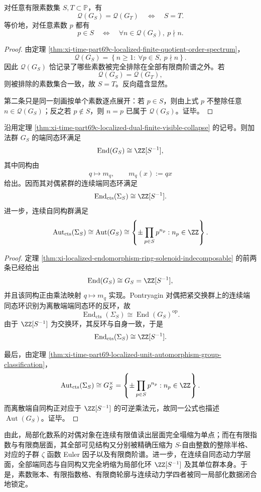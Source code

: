 \begin{corollary}[有限商轮廓对素数账本的完全恢复]\label{cor:xi-time-part69c-localized-finite-quotient-profile-recovers-primes}
对任意有限素数集 \(S,T\subset\mathbb P\)，有
\[
\mathcal Q(G_S)=\mathcal Q(G_T)
\quad\Longleftrightarrow\quad
S=T.
\]
等价地，对任意素数 \(p\) 都有
\[
p\in S
\quad\Longleftrightarrow\quad
\forall n\in \mathcal Q(G_S),\ p\nmid n.
\]
\end{corollary}
\begin{proof}
由定理 \ref{thm:xi-time-part69c-localized-finite-quotient-order-spectrum}，
\[
\mathcal Q(G_S)
=
\left\{
n\ge 1:\ \forall p\in S,\ p\nmid n
\right\}.
\]
因此 \(\mathcal Q(G_S)\) 恰记录了哪些素数被完全排除在全部有限商阶谱之外。若
\[
\mathcal Q(G_S)=\mathcal Q(G_T),
\]
则被排除的素数集合一致，故 \(S=T\)。反向蕴含显然。

第二条只是同一刻画按单个素数逐点展开：若 \(p\in S\)，则由上式 \(p\) 不整除任意 \(n\in\mathcal Q(G_S)\)；反之若 \(p\notin S\)，则 \(n=p\) 已属于 \(\mathcal Q(G_S)\)。证毕。
\end{proof}

\begin{theorem}[局部化数系的连续自同态环完全由局部化环穷尽]\label{thm:xi-time-part69c-localized-dual-endomorphism-ring-exhaustion}
沿用定理 \ref{thm:xi-time-part69c-localized-dual-finite-visible-collapse} 的记号。则加法群 \(G_S\) 的端同态环满足
\[
\operatorname{End}(G_S)\cong \ZZ[S^{-1}],
\]
其中同构由
\[
q\longmapsto m_q,
\qquad
m_q(x):=qx
\]
给出。因而其对偶紧群的连续端同态环满足
\[
\operatorname{End}_{\mathrm{cts}}(\Sigma_S)\cong \ZZ[S^{-1}].
\]
进一步，连续自同构群满足
\[
\operatorname{Aut}_{\mathrm{cts}}(\Sigma_S)
\cong
\operatorname{Aut}(G_S)
\cong
\left\{
\pm\prod_{p\in S}p^{n_p}: n_p\in\ZZ
\right\}.
\]
\end{theorem}
\begin{proof}
定理 \ref{thm:xi-localized-endomorphism-ring-solenoid-indecomposable} 的前两条已经给出
\[
\operatorname{End}(G_S)\cong G_S=\ZZ[S^{-1}],
\]
并且该同构正由乘法映射 \(q\mapsto m_q\) 实现。Pontryagin 对偶把紧交换群上的连续端同态环识别为离散端端同态环的反环，故
\[
\operatorname{End}_{\mathrm{cts}}(\Sigma_S)\cong \operatorname{End}(G_S)^{\mathrm{op}}.
\]
由于 \(\ZZ[S^{-1}]\) 为交换环，其反环与自身一致，于是
\[
\operatorname{End}_{\mathrm{cts}}(\Sigma_S)\cong \ZZ[S^{-1}].
\]

最后，由定理 \ref{thm:xi-time-part69-localized-unit-automorphism-group-classification}，
\[
\operatorname{Aut}_{\mathrm{cts}}(\Sigma_S)
\cong
G_S^\times
=
\left\{
\pm\prod_{p\in S}p^{n_p}: n_p\in\ZZ
\right\}.
\]
而离散端自同构正对应于 \(\ZZ[S^{-1}]\) 的可逆乘法元，故同一公式也描述 \(\operatorname{Aut}(G_S)\)。证毕。
\end{proof}

\noindent
由此，局部化数系的对偶对象在连续有限值读出层面完全塌缩为单点；而在有限指数与有限商层面，其全部可见结构又分别被精确压缩为 \(S\)-自由整数的整除半格、对应的子群 \(\zeta\) 函数 Euler 因子以及有限商阶谱。进一步，在连续自同态动力学层面，全部端同态与自同构又完全坍缩为局部化环 \(\ZZ[S^{-1}]\) 及其单位群本身。于是，素数账本、有限指数格、有限商轮廓与连续动力学四者被同一局部化数据闭合地锁定。

\endinput
